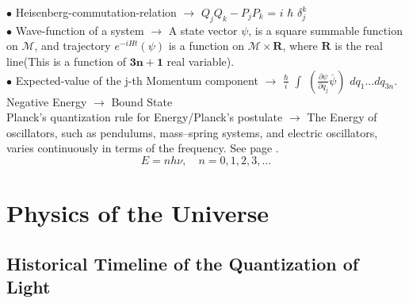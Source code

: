 \documentclass[a4paper, 10pt, onepage]{elegantbook}
\begin{document}
{$\bullet$ Heisenberg-commutation-relation $\longrightarrow$ ${Q_j}{Q_k} - {P_j}{P_k}$ = $i$ $\hbar$ $\delta_j^k$ \\
 
$\bullet$ Wave-function of a system $\longrightarrow$ A state vector $\psi$, is a square summable function on $\mathscr M$, and
trajectory $e^{-i Ht}(\psi)$ is a function on $\mathscr M \times \mathbf R$, where $\mathbf R$ is the real line(This is a function of $\mathbf{3n + 1}$ real variable).  \\
  
$\bullet$ Expected-value of the j-th Momentum component $\longrightarrow$ $\frac{\hbar}{i}$ $\int$ $\left(\frac{\partial \psi}{\partial q_j} \overline {\psi} \right)$ $dq_1...dq_{3n}$.  \\

Negative Energy $\longrightarrow$ Bound State  \\

Planck’s quantization rule for Energy/Planck’s postulate  $\longrightarrow$ The Energy of oscillators, such as pendulums, mass–spring systems, and electric
oscillators, varies continuously in terms of the frequency. See page \pageref{sec:Ideas}.
\[
E = nh\nu, \quad n = 0, 1, 2, 3, \dots
\]




  
\chapter{Physics of the Universe}

\section{Historical Timeline of the Quantization of Light}

}
\end{document}
